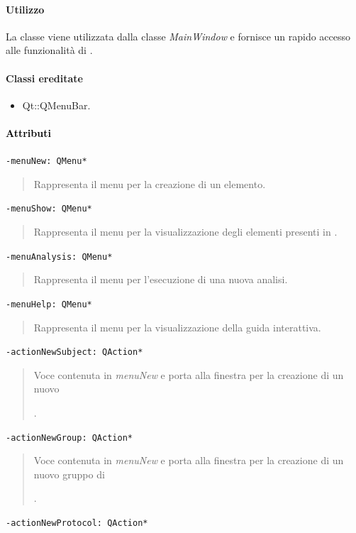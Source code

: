 \paragraph{Utilizzo\\}
La classe viene utilizzata dalla classe \emph{MainWindow}	 e fornisce un rapido accesso alle funzionalità di \project{}.
\paragraph{Classi ereditate\\}
\begin{itemize}
\item Qt::QMenuBar.
\end{itemize}
\paragraph{\textcolor{black}{Attributi\\}}
\color{teal}\verb!-menuNew: QMenu*!
\begin{quote}
\color{black} Rappresenta il menu per la creazione di un elemento.
\end{quote}
\color{teal}\verb!-menuShow: QMenu*!
\begin{quote}
\color{black} Rappresenta il menu per la visualizzazione degli elementi presenti in \project{}.
\end{quote}
\color{teal}\verb!-menuAnalysis: QMenu*!
\begin{quote}
\color{black} Rappresenta il menu per l'esecuzione di una nuova analisi.
\end{quote}
\color{teal}\verb!-menuHelp: QMenu*!
\begin{quote}
\color{black} Rappresenta il menu per la visualizzazione della guida interattiva.
\end{quote}
\color{teal}\verb!-actionNewSubject: QAction*!
\begin{quote}
\color{black} Voce contenuta in \emph{menuNew} e porta alla finestra per la creazione di un nuovo \subject{}.
\end{quote}
\color{teal}\verb!-actionNewGroup: QAction*!
\begin{quote}
\color{black} Voce contenuta in \emph{menuNew} e porta alla finestra per la creazione di un nuovo gruppo di  \subject{}.
\end{quote}
\color{teal}\verb!-actionNewProtocol: QAction*!
